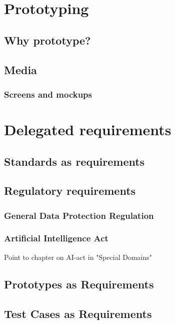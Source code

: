 \documentclass{reqengbook}
\begin{document}
\chapter{Prototyping}

\section{Why prototype?}

\section{Media}

\subsection{Screens and mockups}


\chapter{Delegated requirements}

\section{Standards as requirements}

\section{Regulatory requirements}

\subsection{General Data Protection Regulation} 

\subsection{Artificial Intelligence Act}
Point to chapter on AI-act in "Special Domains"

\section{Prototypes as Requirements}

\section{Test Cases as Requirements}
\end{document}
